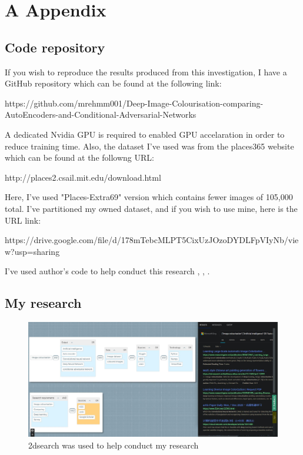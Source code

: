 \chapter*{A Appendix}
\section*{Code repository}
If you wish to reproduce the results produced from this investigation, I have a GitHub repository which can be found at the following link:

https://github.com/mrehmm001/Deep-Image-Colourisation-comparing-AutoEncoders-and-Conditional-Adversarial-Networks

A dedicated Nvidia GPU is required to enabled GPU accelaration in order to reduce training time. Also, the dataset I've used was from the places365 website which can be found at the followng URL:

http://places2.csail.mit.edu/download.html

Here, I've used "Places-Extra69" version which contains fewer images of 105,000 total. I've partitioned my owned dataset, and if you wish to use mine, here is the URL link:

https://drive.google.com/file/d/178mTebcMLPT5CixUzJOzoDYDLFpVIyNb/view?usp=sharing

I've used author's code to help conduct this research \cite{deepkoal2017code}, \cite{vitoria2020chromagancode}, \cite{vitoria2020chromagancode}.
\pagebreak


\section*{My research}
\begin{figure}[H]
    \centering
    \includegraphics[width=1\columnwidth]{sections/appendix/my_research.JPG}
    \caption{2dsearch was used to help conduct my research}
    \label{fig:my_label}
\end{figure}

